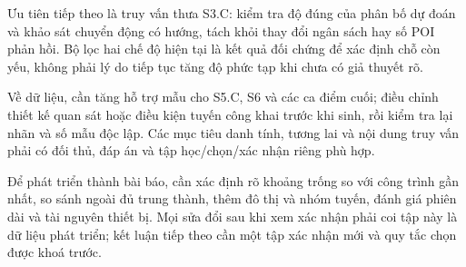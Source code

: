 Ưu tiên tiếp theo là truy vấn thưa S3.C: kiểm tra độ đúng của phân bố dự đoán và khảo sát chuyển động có hướng, tách khỏi thay đổi ngân sách hay số POI phản hồi. Bộ lọc hai chế độ hiện tại là kết quả đối chứng để xác định chỗ còn yếu, không phải lý do tiếp tục tăng độ phức tạp khi chưa có giả thuyết rõ.

Về dữ liệu, cần tăng hỗ trợ mẫu cho S5.C, S6 và các ca điểm cuối; điều chỉnh thiết kế quan sát hoặc điều kiện tuyến công khai trước khi sinh, rồi kiểm tra lại nhãn và số mẫu độc lập. Các mục tiêu danh tính, tương lai và nội dung truy vấn phải có đối thủ, đáp án và tập học/chọn/xác nhận riêng phù hợp.

Để phát triển thành bài báo, cần xác định rõ khoảng trống so với công trình gần nhất, so sánh ngoài đủ trung thành, thêm đô thị và nhóm tuyến, đánh giá phiên dài và tài nguyên thiết bị. Mọi sửa đổi sau khi xem xác nhận phải coi tập này là dữ liệu phát triển; kết luận tiếp theo cần một tập xác nhận mới và quy tắc chọn được khoá trước.
